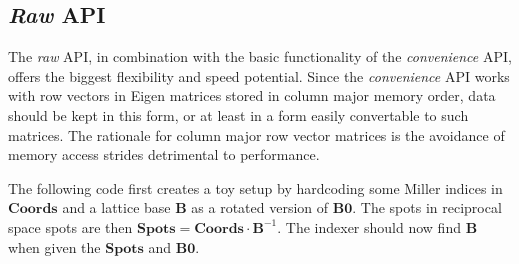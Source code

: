 \documentclass[a4paper,10pt]{article}
\newcommand{\mat}[1]{\mathbf{#1}}
\begin{document}
\subsection{\emph{Raw} API}
\lstset{language=C++}

The \emph{raw} API, in combination with the basic functionality of the \emph{convenience} API, offers the biggest flexibility and speed potential. Since the \emph{convenience} API works with row vectors in Eigen matrices stored in column major memory order, data should be kept in this form, or at least in a form easily convertable to such matrices. The rationale for column major row vector matrices is the avoidance of memory access strides detrimental to performance.

The following code first creates a toy setup by hardcoding some Miller indices in $\mat{Coords}$ and a lattice base $\mat{B}$ as a rotated version of $\mat{B0}$. The spots in reciprocal space spots are then $\mat{Spots}=\mat{Coords}\cdot\mat{B}^{-1}$. The indexer should now find $\mat{B}$ when given the $\mat{Spots}$ and $\mat{B0}$.
%
\end{document}
